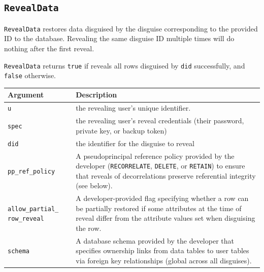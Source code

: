     \subsection{\texttt{RevealData}}

    \texttt{RevealData} restores data disguised by the disguise corresponding to the provided ID to
    the database. Revealing the same disguise ID multiple times will do nothing
    after the first reveal. 

    \texttt{RevealData} returns \texttt{true} if \sys reveals all rows disguised by \texttt{did}
successfully, and \texttt{false} otherwise.

\begin{center}
    \begin{longtable}{|m{}|m{}|}
        \hline
        \textbf{Argument} & \textbf{Description} \\
        \hline
             \texttt{u}& the revealing user's unique identifier. \\
        \hline
        \texttt{spec} & the revealing user's reveal credentials (their password, private key, or
    backup token)\\
        \hline
        \texttt{did}& the identifier for the disguise to reveal\\
        \hline
        \texttt{pp\_ref\_policy} & A pseudoprincipal reference policy provided
        by the developer (\texttt{RECORRELATE}, \texttt{DELETE},
    or \texttt{RETAIN}) to ensure that reveals of decorrelations preserve
        referential integrity (see below). \\
        \hline
        \texttt{allow\_partial\_} \texttt{row\_reveal}& A developer-provided flag
        specifying whether a row can be partially restored if some attributes at
            the time of reveal differ from the attribute values set when
            disguising the row.\\
        \hline
        \texttt{schema} & A database schema provided by the developer that specifies
    ownership links from data tables to user tables via foreign key
    relationships (global across all disguises).  \\
        \hline
    \end{longtable}
    \end{center}
    \vspace{-12pt}
